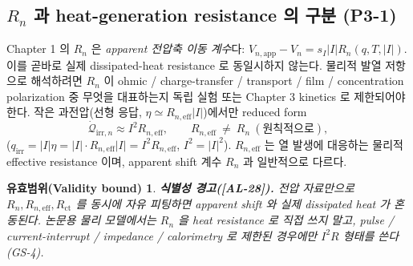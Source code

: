 \documentclass[11pt,a4paper]{article}
\newtheorem*{boundbox}{유효범위(Validity bound)}
\newcommand{\eff}{\mathrm{eff}}
\newcommand{\app}{\mathrm{app}}
\newcommand{\irr}{\mathrm{irr}}
\newcommand{\AL}[1]{\textsf{[AL-#1]}}
\begin{document}
\subsection{$R_n$ 과 heat-generation resistance 의 구분 (P3-1)}\label{sec:ch2_Rn}
Chapter 1 의 $R_n$ 은 \emph{apparent 전압축 이동 계수}다: $V_{n,\app}-V_n=s_I|I|R_n(q,T,|I|)$. 이를 곧바로
실제 dissipated-heat resistance 로 동일시하지 않는다. 물리적 발열 저항으로 해석하려면 $R_n$ 이 ohmic /
charge-transfer / transport / film / concentration polarization 중 무엇을 대표하는지 독립 실험 또는 Chapter 3
kinetics 로 제한되어야 한다. 작은 과전압(선형 응답, $\eta\simeq R_{n,\eff}|I|$)에서만 reduced form
\begin{equation}
\dot{\mathcal Q}_{\irr,n}\approx I^2R_{n,\eff},\qquad R_{n,\eff}\ \ne\ R_n\ (\text{원칙적으로}),
\label{eq:ch2_i2r}
\end{equation}
($q_\irr=|I|\eta=|I|\cdot R_{n,\eff}|I|=I^2 R_{n,\eff}$, $I^2=|I|^2$). $R_{n,\eff}$ 는 열 발생에 대응하는
물리적 effective resistance 이며, apparent shift 계수 $R_n$ 과 일반적으로 다르다.
\begin{boundbox}
\textbf{식별성 경고(\AL{28}).} 전압 자료만으로 $R_n,R_{n,\eff},R_{\mathrm{ct}}$ 를 동시에 자유 피팅하면
apparent shift 와 실제 dissipated heat 가 혼동된다. 논문용 물리 모델에서는 $R_n$ 을 heat resistance 로 직접
쓰지 말고, pulse / current-interrupt / impedance / calorimetry 로 제한된 경우에만 $I^2R$ 형태를 쓴다(GS-4).
\end{boundbox}

\end{document}
